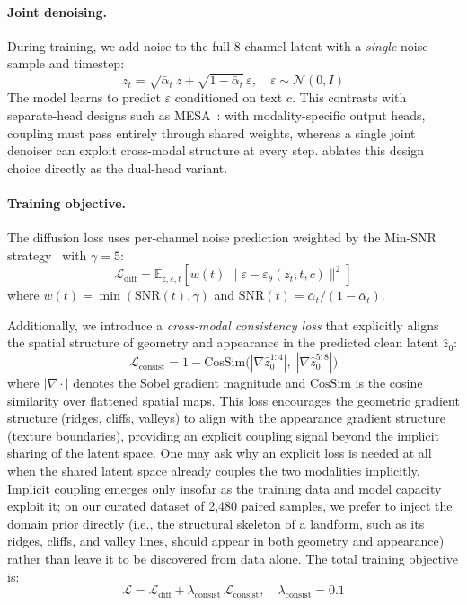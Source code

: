 \documentclass[review]{vgtc}                 %
\begin{document}
\paragraph{Joint denoising.}
During training, we add noise to the full 8-channel latent with a \emph{single} noise sample and timestep:
\begin{equation}
  z_t = \sqrt{\bar{\alpha}_t}\, z + \sqrt{1 - \bar{\alpha}_t}\, \varepsilon, \quad \varepsilon \sim \mathcal{N}(0, I)
  \label{eq:forward}
\end{equation}
The model learns to predict $\varepsilon$ conditioned on text $c$.
This contrasts with separate-head designs such as MESA~\cite{MESA:2025}: with modality-specific output heads, coupling must pass entirely through shared weights, whereas a single joint denoiser can exploit cross-modal structure at every step.  ablates this design choice directly as the dual-head variant.

\paragraph{Training objective.}
The diffusion loss uses per-channel noise prediction weighted by the Min-SNR strategy~\cite{DDPM:2020} with $\gamma = 5$:
\begin{equation}
  \mathcal{L}_{\text{diff}} = \mathbb{E}_{z, \varepsilon, t}\left[w(t)\,\| \varepsilon - \varepsilon_\theta(z_t, t, c) \|^2 \right]
  \label{eq:diffusion_loss}
\end{equation}
where $w(t) = \min(\text{SNR}(t), \gamma)$ and $\text{SNR}(t) = \bar{\alpha}_t / (1 - \bar{\alpha}_t)$.

Additionally, we introduce a \emph{cross-modal consistency loss} that explicitly aligns the spatial structure of geometry and appearance in the predicted clean latent $\hat{z}_0$:
\begin{equation}
  \mathcal{L}_{\text{consist}} = 1 - \text{CosSim}\big(|\nabla \hat{z}_0^{1:4}|,\; |\nabla \hat{z}_0^{5:8}|\big)
  \label{eq:consistency_loss}
\end{equation}
where $|\nabla \cdot|$ denotes the Sobel gradient magnitude and $\text{CosSim}$ is the cosine similarity over flattened spatial maps.
This loss encourages the geometric gradient structure (ridges, cliffs, valleys) to align with the appearance gradient structure (texture boundaries), providing an explicit coupling signal beyond the implicit sharing of the latent space.
One may ask why an explicit loss is needed at all when the shared latent space already couples the two modalities implicitly.
Implicit coupling emerges only insofar as the training data and model capacity exploit it; on our curated dataset of 2{,}480 paired samples, we prefer to inject the domain prior directly (i.e., the structural skeleton of a landform, such as its ridges, cliffs, and valley lines, should appear in both geometry and appearance) rather than leave it to be discovered from data alone.
The total training objective is:
\begin{equation}
  \mathcal{L} = \mathcal{L}_{\text{diff}} + \lambda_{\text{consist}}\, \mathcal{L}_{\text{consist}}, \quad \lambda_{\text{consist}} = 0.1
  \label{eq:total_loss}
\end{equation}
\end{document}
